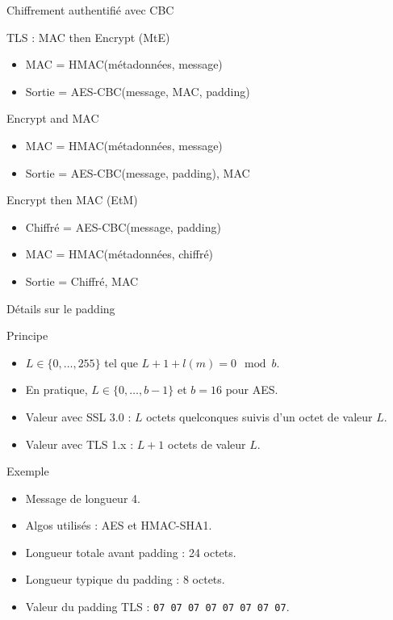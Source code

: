 \documentclass{mpg-ep-slides}
\begin{document}
\begin{frame}{Chiffrement authentifié avec CBC}
  \begin{block}{TLS : MAC then Encrypt (MtE)}
    \begin{itemize}
      \item MAC = HMAC(métadonnées, message)
      \item Sortie = AES-CBC(message, MAC, padding)
    \end{itemize}
  \end{block}

  \begin{block}{Encrypt and MAC}
    \begin{itemize}
      \item MAC = HMAC(métadonnées, message)
      \item Sortie = AES-CBC(message, padding), MAC
    \end{itemize}
  \end{block}

  \begin{block}{Encrypt then MAC (EtM)}
    \begin{itemize}
      \item Chiffré = AES-CBC(message, padding)
      \item MAC = HMAC(métadonnées, chiffré)
      \item Sortie = Chiffré, MAC
    \end{itemize}
  \end{block}
\end{frame}

\begin{frame}{Détails sur le padding}
  \begin{block}{Principe}
    \begin{itemize}
      \item $L \in \{ 0, \dots, 255 \}$ tel que \( L + 1 + l(m) = 0 \mod b \).
      \item En pratique, \( L \in \{ 0, \dots, b - 1 \} \) et \( b = 16 \)
        pour AES.
      \item Valeur avec SSL 3.0 : $L$ octets quelconques suivis d'un octet de
        valeur $L$.
      \item Valeur avec TLS 1.x : $L + 1$ octets de valeur $L$.
    \end{itemize}
  \end{block}

  \begin{block}{Exemple}
    \begin{itemize}
      \item Message de longueur 4.
      \item Algos utilisés : AES et HMAC-SHA1.
      \item Longueur totale avant padding : 24 octets.
      \item Longueur typique du padding : 8 octets.
      \item Valeur du padding TLS : \texttt{07 07 07 07 07 07 07 07}.
    \end{itemize}
  \end{block}
\end{frame}
\end{document}
